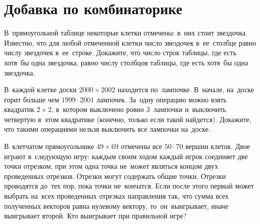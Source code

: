 
\section*{Добавка по комбинаторике}


\begin{problems}

\item
В~прямоугольной таблице некоторые клетки отмечены: в~них стоит звездочка.
Известно, что для любой отмеченной клетки число звездочек в~ее~столбце равно
числу звездочек в~ее~строке.
Докажите, что число строк таблицы, где есть хотя~бы одна звездочка, равно числу
столбцов таблицы, где есть хотя~бы одна звездочка.

\item
В~каждой клетке доски $2000 \times 2002$ находится по~лампочке.
В~начале, на~доске горит больше чем $1999 \cdot 2001$ лампочек.
За~одну операцию можно взять квадратик $2\times 2$, в~котором выключено ровно
3~лампочки и~выключить четвертую в~этом квадратике (конечно, только если такой
найдется).
Докажите, что такими операциями нельзя выключить все лампочки на~доске.

\item
В~клетчатом прямоугольнике $49 \times 69$ отмечены все $50 \cdot 70$ вершин
клеток.
Двое играют в~следующую игру: каждым своим ходом каждый игрок соединяет две
точки отрезком, при этом одна точка не~может являться концом двух проведенных
отрезков.
Отрезки могут содержать общие точки.
Отрезки проводятся до~тех пор, пока точки не~кончатся.
Если после этого первый может выбрать на~всех проведенных отрезках направления
так, что сумма всех полученных векторов равна нулевому вектору,
то~он~выигрывает, иначе выигрывает второй.
Кто выигрывает при правильной игре?

\end{problems}

